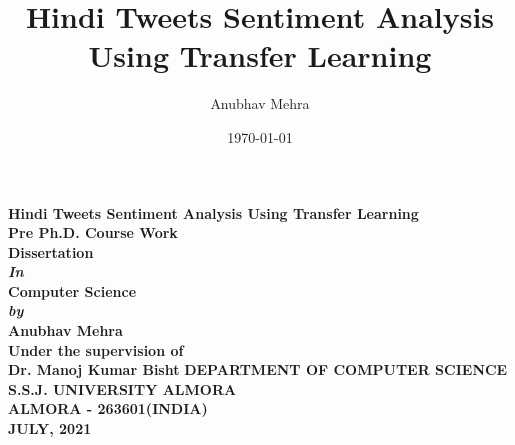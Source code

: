 \documentclass[a4paper, 12pt]{article}
\title{Hindi Tweets Sentiment Analysis Using Transfer Learning}
\author{Anubhav Mehra}
\date{\today}
\begin{document}
\begin{titlepage}
	\begin{center}
		\vspace*{1cm}
			\Large{\textbf{Hindi Tweets Sentiment Analysis Using Transfer Learning}}\\
			\vspace*{3cm}
			\large{\textbf{Pre Ph.D. Course Work \\ Dissertation}}\\
			\large{\textbf{\textit{In}}}\\
			\large{\textbf{Computer Science}}\\
			\large{\textit{\textbf{by}}} \\
			\large{\textbf{Anubhav Mehra}}\\
			\vspace*{1cm}
			\large{\textbf{Under the supervision of}}\\
			\large{\textbf{Dr. Manoj Kumar Bisht}}
			\vfill
			\Large{\textbf{DEPARTMENT OF COMPUTER SCIENCE \\ S.S.J. UNIVERSITY ALMORA \\ ALMORA - 263601(INDIA) \\ JULY, 2021}}
			
			\normalsize
			
	\end{center}
\end{titlepage}
\end{document}
